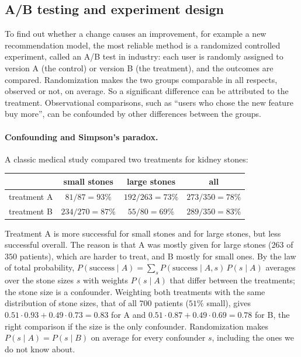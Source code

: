 \subsection{A/B testing and experiment design}

To find out whether a change causes an improvement, for example a new recommendation model, the most reliable method is a randomized controlled experiment, called an A/B test in industry: each user is randomly assigned to version A (the control) or version B (the treatment), and the outcomes are compared. Randomization makes the two groups comparable in all respects, observed or not, on average. So a significant difference can be attributed to the treatment. Observational comparisons, such as ``users who chose the new feature buy more'', can be confounded by other differences between the groups.

\paragraph{Confounding and Simpson's paradox.} A classic medical study compared two treatments for kidney stones:
\begin{center}
    \renewcommand{\arraystretch}{1.2}
    \begin{tabular}{l|ccc}
        & small stones & large stones & all \\
        \hline
        treatment A & $81/87 = 93\%$ & $192/263 = 73\%$ & $273/350 = 78\%$ \\
        treatment B & $234/270 = 87\%$ & $55/80 = 69\%$ & $289/350 = 83\%$
    \end{tabular}
\end{center}
Treatment A is more successful for small stones and for large stones, but less successful overall. The reason is that A was mostly given for large stones ($263$ of $350$ patients), which are harder to treat, and B mostly for small ones. By the law of total probability, $P(\text{success} \mid A) = \sum_s P(\text{success} \mid A, s)\,P(s \mid A)$ averages over the stone sizes $s$ with weights $P(s \mid A)$ that differ between the treatments; the stone size is a confounder. Weighting both treatments with the same distribution of stone sizes, that of all $700$ patients ($51\%$ small), gives $0.51 \cdot 0.93 + 0.49 \cdot 0.73 = 0.83$ for A and $0.51 \cdot 0.87 + 0.49 \cdot 0.69 = 0.78$ for B, the right comparison if the size is the only confounder. Randomization makes $P(s \mid A) = P(s \mid B)$ on average for every confounder $s$, including the ones we do not know about.

